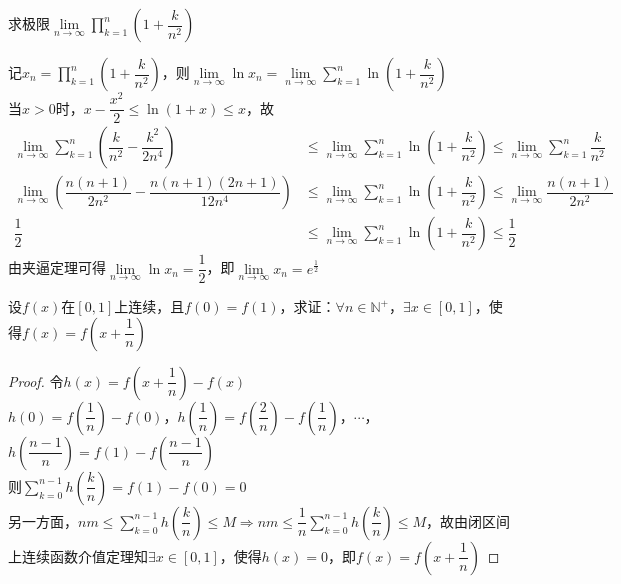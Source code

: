 \documentclass[12pt, a4paper, oneside, UTF8]{ctexbook}
\begin{document}
\begin{exercise}
    求极限$\lim\limits_{n \to \infty} \displaystyle\prod_{k=1}^{n} \left(1+\dfrac{k}{n^2}\right)$
\end{exercise}
\begin{solution}
    记$x_n = \displaystyle\prod_{k=1}^{n} \left(1+\dfrac{k}{n^2}\right)$，则$\lim\limits_{n \to \infty} \ln x_n = \lim\limits_{n \to \infty} \displaystyle\sum_{k=1}^{n} \ln\left(1+\dfrac{k}{n^2}\right)$\\
    当$x > 0$时，$x-\dfrac{x^2}{2} \le \ln(1+x) \le x$，故
    \begin{align*}
        \lim\limits_{n \to \infty} \displaystyle\sum_{k=1}^{n} \left(\dfrac{k}{n^2} - \dfrac{k^2}{2n^4}\right)
        &\le \lim\limits_{n \to \infty} \displaystyle\sum_{k=1}^{n} \ln\left(1+\dfrac{k}{n^2}\right) \le \lim\limits_{n \to \infty} \displaystyle\sum_{k=1}^{n} \dfrac{k}{n^2}\\
        \lim\limits_{n \to \infty} \left(\dfrac{n(n+1)}{2n^2} - \dfrac{n(n+1)(2n+1)}{12n^4}\right)
        &\le \lim\limits_{n \to \infty} \displaystyle\sum_{k=1}^{n} \ln\left(1+\dfrac{k}{n^2}\right) \le \lim\limits_{n \to \infty} \dfrac{n(n+1)}{2n^2}\\
        \dfrac{1}{2} &\le \lim\limits_{n \to \infty} \displaystyle\sum_{k=1}^{n} \ln\left(1+\dfrac{k}{n^2}\right) \le \dfrac{1}{2}
    \end{align*}
    由夹逼定理可得$\lim\limits_{n \to \infty} \ln x_n = \dfrac{1}{2}$，即$\lim\limits_{n \to \infty} x_n = \boxed{e^{\frac{1}{2}}}$
\end{solution}
\begin{exercise}
    设$f(x)$在$[0,1]$上连续，且$f(0)=f(1)$，求证：$\forall n \in \mathbb{N}^+$，$\exists x \in [0,1]$，使得$f(x)=f\left(x+\dfrac{1}{n}\right)$
\end{exercise}
\begin{proof}
    令$h(x)=f\left(x+\dfrac{1}{n}\right)-f(x)$\\[6pt]
    $h(0)=f\left(\dfrac{1}{n}\right)-f(0)$，$h(\dfrac{1}{n})=f\left(\dfrac{2}{n}\right)-f\left(\dfrac{1}{n}\right)$，$\cdots$，$h\left(\dfrac{n-1}{n}\right)=f(1)-f\left(\dfrac{n-1}{n}\right)$\\[6pt]
    则$\displaystyle\sum_{k=0}^{n-1} h\left(\dfrac{k}{n}\right)=f(1)-f(0)=0$\\
    另一方面，$nm \le \displaystyle\sum_{k=0}^{n-1} h\left(\dfrac{k}{n}\right) \le M \Rightarrow nm \le \dfrac{1}{n}\displaystyle\sum_{k=0}^{n-1} h\left(\dfrac{k}{n}\right) \le M$，故由闭区间上连续函数介值定理知$\exists x \in [0,1]$，使得$h(x)=0$，即$f(x)=f\left(x+\dfrac{1}{n}\right)$
\end{proof}
\end{document}

